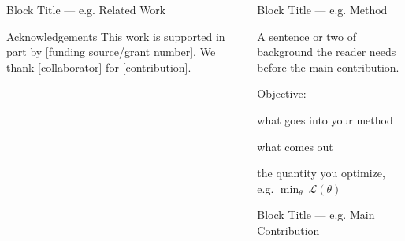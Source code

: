 \documentclass[final,dvipsnames]{beamer}
\newlength{\colWidth}
\begin{document}
\begin{frame}[t]
\begin{columns}[t]
\begin{column}{\colWidth}
\begin{block}{Block Title --- e.g. Related Work}
        \end{block}

        \vspace*{-0.25\baselineskip}

        \begin{block}{Acknowledgements}
          This work is supported in part by [funding source/grant number]. We thank
          [collaborator] for [contribution].
        \end{block}

      \end{column}


      \begin{column}{\colWidth}

        \begin{block}{Block Title --- e.g. Method}

          A sentence or two of background the reader needs before the main contribution.


          \begin{namelist}{Objective:}
            \item[Input:] what goes into your method
            \item[Output:] what comes out
            \item[Objective:] the quantity you optimize, e.g. $\displaystyle\min_{\theta}\ \mathcal{L}(\theta)$
          \end{namelist}

        \end{block}

        \vspace*{-0.25\baselineskip}

        \begin{block}{Block Title --- e.g. Main Contribution}


\end{block}
\end{column}
\end{columns}
\end{frame}
\end{document}
